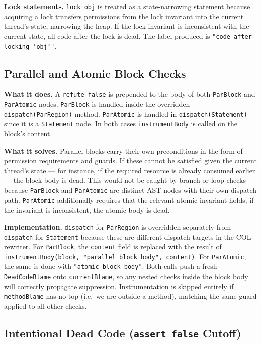 \documentclass[9pt,a4paper,twocolumn]{article}
\begin{document}
\textbf{Lock statements.} \texttt{lock obj} is treated as a
state-narrowing statement because acquiring a lock transfers
permissions from the lock invariant into the current thread's
state, narrowing the heap. If the lock invariant is inconsistent
with the current state, all code after the lock is dead. The label
produced is \texttt{"code after locking `obj`"}.

\subsection{Parallel and Atomic Block Checks}

\textbf{What it does.} A \texttt{refute false} is prepended to
the body of both \texttt{ParBlock} and \texttt{ParAtomic} nodes.
\texttt{ParBlock} is handled inside the overridden
\texttt{dispatch(ParRegion)} method. \texttt{ParAtomic} is handled
in \texttt{dispatch(Statement)} since it is a \texttt{Statement}
node. In both cases \texttt{instrumentBody} is called on the
block's content.

\textbf{What it solves.} Parallel blocks carry their own
preconditions in the form of permission requirements and guards.
If these cannot be satisfied given the current thread's state —
for instance, if the required resource is already consumed earlier
— the block body is dead. This would not be caught by branch or
loop checks because \texttt{ParBlock} and \texttt{ParAtomic} are
distinct AST nodes with their own dispatch path.
\texttt{ParAtomic} additionally requires that the relevant atomic
invariant holds; if the invariant is inconsistent, the atomic
body is dead.

\textbf{Implementation.} \texttt{dispatch} for \texttt{ParRegion}
is overridden separately from \texttt{dispatch} for
\texttt{Statement} because these are different dispatch targets in
the COL rewriter. For \texttt{ParBlock}, the \texttt{content}
field is replaced with the result of \texttt{instrumentBody(block,
"parallel block body", content)}. For \texttt{ParAtomic}, the
same is done with \texttt{"atomic block body"}. Both calls push a
fresh \texttt{DeadCodeBlame} onto \texttt{currentBlame}, so any
nested checks inside the block body will correctly propagate
suppression. Instrumentation is skipped entirely if
\texttt{methodBlame} has no top (i.e.\ we are outside a method),
matching the same guard applied to all other checks.

\subsection{Intentional Dead Code (\texttt{assert false} Cutoff)}
\end{document}
